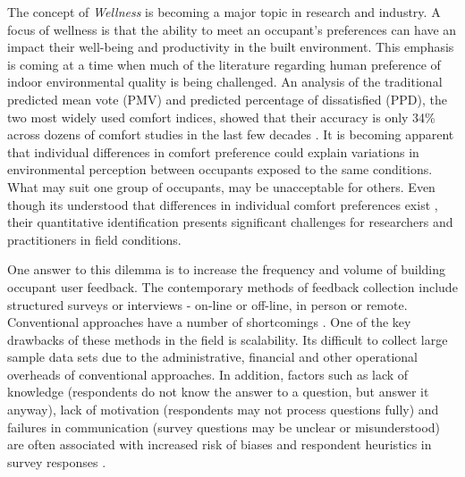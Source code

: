 

The concept of \emph{Wellness} is becoming a major topic in research and industry. A focus of wellness is that the ability to meet an occupant's preferences can have an impact their well-being and productivity in the built environment. This emphasis is coming at a time when much of the literature regarding human preference of indoor environmental quality is being challenged. An analysis of the traditional predicted mean vote (PMV) and predicted percentage of dissatisfied (PPD), the two most widely used comfort indices, showed that their accuracy is only 34\% across dozens of comfort studies in the last few decades \cite{cheung2019analysis, livcina2018development}. It is becoming apparent that individual differences in comfort preference could explain variations in environmental perception between occupants exposed to the same conditions. What may suit one group of occupants, may be unacceptable for others. Even though its understood that differences in individual comfort preferences exist \cite{WANG2018181}, their quantitative identification presents significant challenges for researchers and practitioners in field conditions. 

One answer to this dilemma is to increase the frequency and volume of building occupant user feedback. The contemporary methods of feedback collection include structured surveys or interviews - on-line or off-line, in person or remote. Conventional approaches have a number of shortcomings \cite{oecd}. One of the key drawbacks of these methods in the field is scalability. Its difficult to collect large sample data sets due to the administrative, financial and other operational overheads of conventional approaches. In addition, factors such as lack of knowledge (respondents do not know the answer to a question, but answer it anyway), lack of motivation (respondents may not process questions fully) and failures in communication (survey questions may be unclear or misunderstood) are often associated with increased risk of biases and respondent heuristics in survey responses \cite{bradburn2004asking}. 

